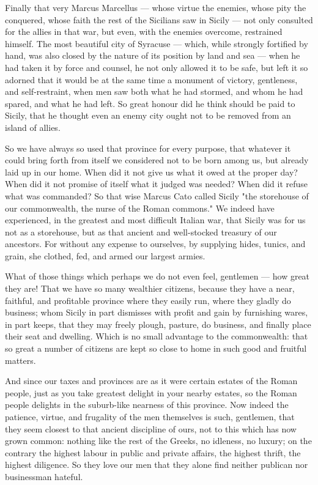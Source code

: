  Finally that very Marcus Marcellus --- whose virtue the enemies, whose pity the conquered, whose faith the rest of the Sicilians saw in Sicily --- not only consulted for the allies in that war, but even, with the enemies overcome, restrained himself. The most beautiful city of Syracuse --- which, while strongly fortified by hand, was also closed by the nature of its position by land and sea --- when he had taken it by force and counsel, he not only allowed it to be safe, but left it so adorned that it would be at the same time a monument of victory, gentleness, and self-restraint, when men saw both what he had stormed, and whom he had spared, and what he had left. So great honour did he think should be paid to Sicily, that he thought even an enemy city ought not to be removed from an island of allies.

 So we have always so used that province for every purpose, that whatever it could bring forth from itself we considered not to be born among us, but already laid up in our home. When did it not give us what it owed at the proper day? When did it not promise of itself what it judged was needed? When did it refuse what was commanded? So that wise Marcus Cato called Sicily "the storehouse of our commonwealth, the nurse of the Roman commons." We indeed have experienced, in the greatest and most difficult Italian war, that Sicily was for us not as a storehouse, but as that ancient and well-stocked treasury of our ancestors. For without any expense to ourselves, by supplying hides, tunics, and grain, she clothed, fed, and armed our largest armies.

 What of those things which perhaps we do not even feel, gentlemen --- how great they are! That we have so many wealthier citizens, because they have a near, faithful, and profitable province where they easily run, where they gladly do business; whom Sicily in part dismisses with profit and gain by furnishing wares, in part keeps, that they may freely plough, pasture, do business, and finally place their seat and dwelling. Which is no small advantage to the commonwealth: that so great a number of citizens are kept so close to home in such good and fruitful matters.

 And since our taxes and provinces are as it were certain estates of the Roman people, just as you take greatest delight in your nearby estates, so the Roman people delights in the suburb-like nearness of this province. Now indeed the patience, virtue, and frugality of the men themselves is such, gentlemen, that they seem closest to that ancient discipline of ours, not to this which has now grown common: nothing like the rest of the Greeks, no idleness, no luxury; on the contrary the highest labour in public and private affairs, the highest thrift, the highest diligence. So they love our men that they alone find neither publican nor businessman hateful.

